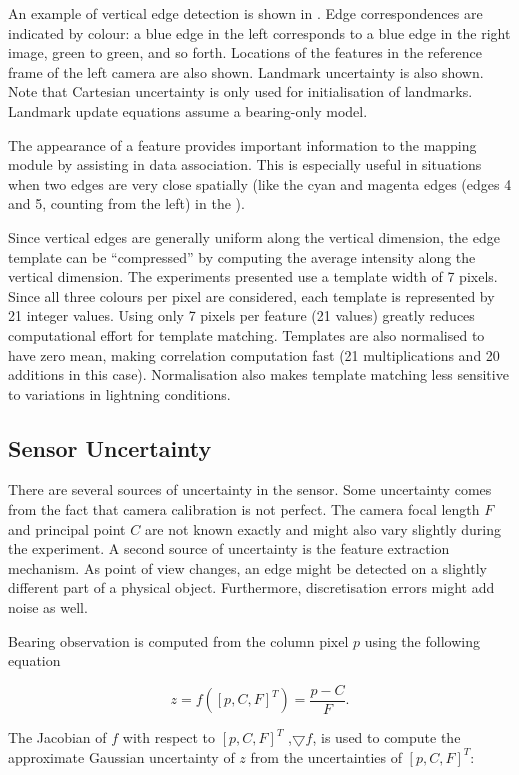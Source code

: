 An example of vertical edge detection is shown in
. Edge correspondences are
indicated by colour: a blue edge in the left corresponds to a blue
edge in the right image, green to green, and so forth. Locations of
the features in the reference frame of the left camera are also
shown. Landmark uncertainty is also shown. Note that Cartesian
uncertainty is only used for initialisation of landmarks. Landmark
update equations assume a bearing-only model.

The appearance of a feature provides important information to the
mapping module by assisting in data association. This is especially
useful in situations when two edges are very close spatially (like
the cyan and magenta edges (edges 4 and 5, counting from the left) in
the ).

Since vertical edges are generally uniform along the vertical
dimension, the edge template can be ``compressed'' by computing the
average intensity along the vertical dimension. The experiments
presented use a template width of 7 pixels. Since all three colours
per pixel are considered, each template is represented by 21 integer
values. Using only 7 pixels per feature (21 values) greatly reduces
computational effort for template matching. Templates are also
normalised to have zero mean, making correlation computation fast (21
multiplications and 20 additions in this case). Normalisation also
makes template matching less sensitive to variations in lightning
conditions.

\subsection{Sensor Uncertainty}

There are several sources of uncertainty in the sensor. Some
uncertainty comes from the fact that camera calibration is not
perfect. The camera focal length $F$ and principal point $C$ are not
known exactly and might also vary slightly during the experiment. A
second source of uncertainty is the feature extraction mechanism. As
point of view changes, an edge might be detected on a slightly
different part of a physical object. Furthermore, discretisation
errors might add noise as well.

Bearing observation is computed from the column pixel $p$ using the
following equation

$$
z = f([p,C,F]^T) = \frac{p - C}{F}.
$$

The Jacobian of $f$ with respect to $[p,C,F]^T$ ,$\bigtriangledown f$, is used to compute the
approximate Gaussian uncertainty of $z$ from the uncertainties of
$[p,C,F]^T$:

